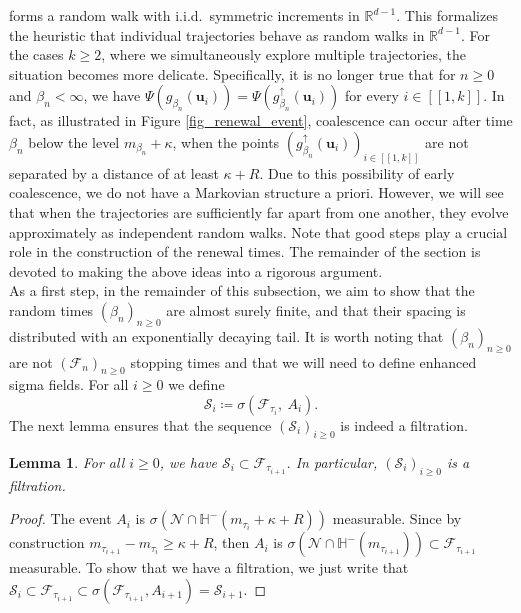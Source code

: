 \documentclass[a4paper, 11pt]{article}
\theoremstyle{plain}
\newtheorem{Lemma}[Theorem]{Lemma}
\theoremstyle{definition}
\newcommand{\R}{\mathbb{R}}
\newcommand{\range}[2]{[\![#1,#2]\!]}
\numberwithin{equation}{section}
\begin{document}
forms a random walk with i.i.d.\ symmetric increments in $\R^{d-1}$. This formalizes the heuristic that individual trajectories behave as random walks in $\R^{d-1}$. For the cases $k\geq 2$, where we simultaneously explore multiple trajectories, the situation becomes more delicate. Specifically, it is no longer true that for $n\geq 0$ and $\beta_n<\infty$, we have $\Psi(g_{\beta_n}(\mathbf u_i))=\Psi(g_{\beta_n}^{\uparrow}(\mathbf u_i))$ for every $i\in\range{1}{k}$. In fact, as illustrated in Figure \ref{fig_renewal_event}, coalescence can occur after time $\beta_n$ below the level $m_{\beta_n}+\kappa$, when the points $(g_{\beta_n}^{\uparrow}(\mathbf u_i))_{i\in\range{1}{k}}$ are not separated by a distance of at least $\kappa+R$. Due to this possibility of early coalescence, we do not have a Markovian structure a priori. However, we will see that when the trajectories are sufficiently far apart from one another, they evolve approximately as independent random walks. Note that good steps play a crucial role in the construction of the renewal times. The remainder of the section is devoted to making the above ideas into a rigorous argument.\\

As a first step, in the remainder of this subsection, we aim to show that the random times $(\beta_n)_{n\geq0}$ are almost surely finite, and that their spacing is distributed with an exponentially decaying tail. It is worth noting that $(\beta_n)_{n\geq0}$ are not $(\mathcal F_n)_{n\geq0}$ stopping times and that we will need to define enhanced sigma fields. For all $i\geq0$ we define
    \[\mathcal S_i\coloneqq\sigma(\mathcal F_{\tau_i},~A_i).\]
The next lemma ensures that the sequence $(\mathcal S_i)_{i\geq0}$ is indeed a filtration.


\begin{Lemma}
    \label{lemma_sfiltration}
    For all $i\geq 0$, we have $\mathcal S_i\subset\mathcal F_{\tau_{i+1}}$. In particular, $(\mathcal S_i)_{i\geq 0}$ is a filtration.
\end{Lemma}

\begin{proof}
    The event $A_i$ is $\sigma(\mathcal N\cap\mathbb H^{-}(m_{\tau_i}+\kappa+R))$ measurable. Since by construction $m_{\tau_{i+1}}-m_{\tau_i}\geq\kappa+R$, then $A_i$ is $\sigma(\mathcal N\cap\mathbb H^{-}(m_{\tau_{i+1}}))\subset\mathcal F_{\tau_{i+1}}$ measurable. To show that we have a filtration, we just write that $\mathcal S_i\subset\mathcal F_{\tau_{i+1}}\subset\sigma(\mathcal F_{\tau_{i+1}}, A_{i+1})=\mathcal S_{i+1}$.
\end{proof}
\end{document}
